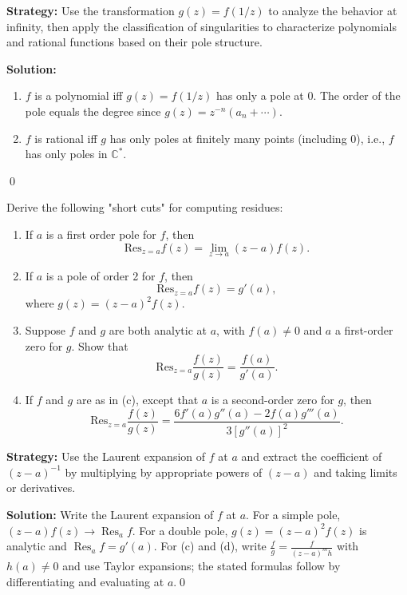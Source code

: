 \noindent\textbf{Strategy:} Use the transformation \( g(z) = f(1/z) \) to analyze the behavior at infinity, then apply the classification of singularities to characterize polynomials and rational functions based on their pole structure.

\bigskip\noindent\textbf{Solution:}
\begin{enumerate}[label=(\alph*)]
\item $f$ is a polynomial iff $g(z)=f(1/z)$ has only a pole at $0$. The order of the pole equals the degree since $g(z)=z^{-n}(a_n+\cdots)$.
\item $f$ is rational iff $g$ has only poles at finitely many points (including $0$), i.e., $f$ has only poles in $\mathbb C^*$.
\end{enumerate}\qed


\begin{problembox}
\begin{problemstatement}
Derive the following "short cuts" for computing residues:
\begin{enumerate}[label=(\alph*)]
\item If \( a \) is a first order pole for \( f \), then
\[ \text{Res}_{z=a} f(z) = \lim_{z \to a} (z - a) f(z). \]
\item If \( a \) is a pole of order 2 for \( f \), then
\[ \text{Res}_{z=a} f(z) = g'(a), \]
where \( g(z) = (z - a)^2 f(z) \).
\item Suppose \( f \) and \( g \) are both analytic at \( a \), with \( f(a) \neq 0 \) and \( a \) a first-order zero for \( g \). Show that
\[ \text{Res}_{z=a} \frac{f(z)}{g(z)} = \frac{f(a)}{g'(a)}. \]
\item If \( f \) and \( g \) are as in (c), except that \( a \) is a second-order zero for \( g \), then
\[ \text{Res}_{z=a} \frac{f(z)}{g(z)} = \frac{6 f'(a) g''(a) - 2 f(a) g'''(a)}{3 [g''(a)]^2}. \]
\end{enumerate}
\end{problemstatement}
\end{problembox}

\noindent\textbf{Strategy:} Use the Laurent expansion of \( f \) at \( a \) and extract the coefficient of \( (z-a)^{-1} \) by multiplying by appropriate powers of \( (z-a) \) and taking limits or derivatives.

\bigskip\noindent\textbf{Solution:}
Write the Laurent expansion of $f$ at $a$. For a simple pole, $(z-a)f(z)\to\operatorname{Res}_a f$. For a double pole, $g(z)=(z-a)^2 f(z)$ is analytic and $\operatorname{Res}_a f=g'(a)$. For (c) and (d), write $\frac{f}{g}=\frac{f}{(z-a)^m h}$ with $h(a)\ne0$ and use Taylor expansions; the stated formulas follow by differentiating and evaluating at $a$.\qed


